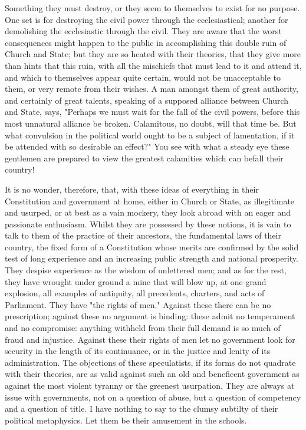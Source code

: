 Something they must destroy, or they seem to themselves to exist for no purpose. One set is for destroying the civil power through the ecclesiastical; another for demolishing the ecclesiastic through the civil. They are aware that the worst consequences might happen to the public in accomplishing this double ruin of Church and State; but they are so heated with their theories, that they give more than hints that this ruin, with all the mischiefs that must lead to it and attend it, and which to themselves appear quite certain, would not be unacceptable to them, or very remote from their wishes. A man amongst them of great authority, and certainly of great talents, speaking of a supposed alliance between Church and State, says, "Perhaps we must wait for the fall of the civil powers, before this most unnatural alliance be broken. Calamitous, no doubt, will that time be. But what convulsion in the political world ought to be a subject of lamentation, if it be attended with so desirable an effect?" You see with what a steady eye these gentlemen are prepared to view the greatest calamities which can befall their country!

It is no wonder, therefore, that, with these ideas of everything in their Constitution and government at home, either in Church or State, as illegitimate and usurped, or at best as a vain mockery, they look abroad with an eager and passionate enthusiasm. Whilst they are possessed by these notions, it is vain to talk to them of the practice of their ancestors, the fundamental laws of their country, the fixed form of a Constitution whose merits are confirmed by the solid test of long experience and an increasing public strength and national prosperity. They despise experience as the wisdom of unlettered men; and as for the rest, they have wrought under ground a mine that will blow up, at one grand explosion, all examples of antiquity, all precedents, charters, and acts of Parliament. They have "the rights of men." Against these there can be no prescription; against these no argument is binding: these admit no temperament and no compromise: anything withheld from their full demand is so much of fraud and injustice. Against these their rights of men let no government look for security in the length of its continuance, or in the justice and lenity of its administration. The objections of these speculatists, if its forms do not quadrate with their theories, are as valid against such an old and beneficent government as against the most violent tyranny or the greenest usurpation. They are always at issue with governments, not on a question of abuse, but a question of competency and a question of title. I have nothing to say to the clumsy subtilty of their political metaphysics. Let them be their amusement in the schools.

